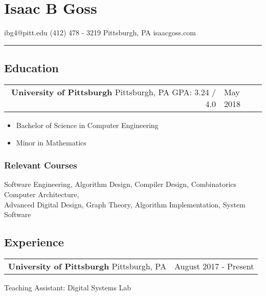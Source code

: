 \documentclass[18pt]{article}
\makeatletter
\providecommand{\tightlist}{
    \setlength{\itemsep}{0pt}\setlength{\parskip}{0pt}
}
\providecommand{\datetable}[2]{
    \begin{tabular*}{\textwidth}{r @{\extracolsep{\fill}} l}
        #1 & #2
    \end{tabular*}
}
\makeatother
\begin{document}
  \section*{Isaac B Goss}\label{isaac-b-goss}
    ibg4@pitt.edu \textbar{} (412) 478 - 3219 \textbar{} Pittsburgh, PA \textbar{} isaacgoss.com
    
    \hrule
    
    \subsection*{Education}\label{education}      
        \datetable{
            \textbf{University of Pittsburgh} \textbar{} 
            Pittsburgh, PA \textbar{} 
            GPA: 3.24 / 4.0
        }{
            May 2018
        }
        \begin{itemize}\tightlist
          \item Bachelor of Science in Computer Engineering
          \item Minor in Mathematics
        \end{itemize}
        \subsubsection*{Relevant Courses}
            Software Engineering,
            Algorithm Design,
            Compiler Design,
            Combinatorics
            Computer Architecture,\\
            Advanced Digital Design,
            Graph Theory,
            Algorithm Implementation,
            System Software
        
    
      
    \subsection*{Experience}\label{experience}
        \datetable{
            \textbf{University of Pittsburgh} \textbar{} Pittsburgh, PA
        }{August 2017 - Present}
        Teaching Assistant: Digital Systems Lab
    
\end{document}
